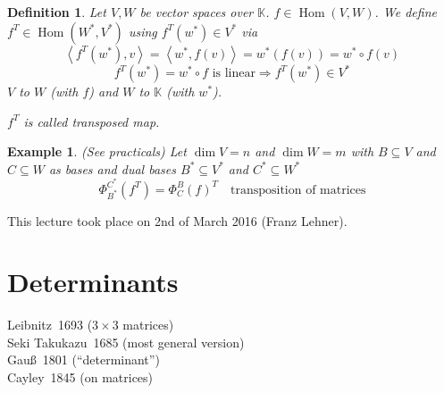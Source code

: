 \documentclass[a4paper,landscape,twocolumn]{article}
\newcommand\meta[3]{This #1 took place on #2 (#3).\par}
\newcommand\functional[1]{\left\langle{#1}\right\rangle}
\newtheorem{defi}{Definition}
\newtheorem{ex}{Example}
\DeclareMathOperator\Hom{Hom} %
\begin{document}
\begin{defi}
  \label{defi-5.32}
  Let $V,W$ be vector spaces over $\mathbb K$. $f \in \Hom(V,W)$.
  We define $f^T \in \Hom(W^*,V^*)$ using $f^T(w^*) \in V^*$ via
  \[ \functional{f^T(w^*),v} = \functional{w^*,f(v)} = w^*(f(v)) = w^* \circ f(v) \]
  \[ f^T(w^*) = w^* \circ f \text{ is linear} \Rightarrow f^T(w^*) \in V^* \]
  $V$ to $W$ (with $f$) and $W$ to $\mathbb K$ (with $w^*$).

  $f^T$ is called \emph{transposed map}.
\end{defi}

\begin{ex}
  (See practicals)
  Let $\dim{V} = n$ and $\dim{W} = m$ with $B \subseteq V$ and $C \subseteq W$ as bases
  and dual bases $B^* \subseteq V^*$ and $C^* \subseteq W^*$
  \[ \Phi_{B^*}^{C^*}(f^T) = \Phi_C^B(f)^T \quad\text{transposition of matrices} \]
\end{ex}

\meta{lecture}{2nd of March 2016}{Franz Lehner}

\section{Determinants}
%
Leibnitz~1693 ($3\times 3$ matrices) \\
Seki Takukazu~1685 (most general version) \\
Gauß~1801 (\enquote{determinant}) \\
Cayley~1845 (on matrices)
\end{document}
